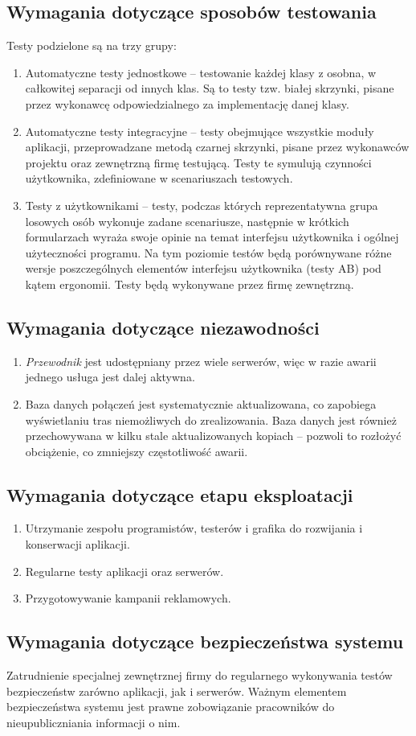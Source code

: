 \documentclass[12pt,a4paper]{report}
\begin{document}
\subsection{Wymagania dotyczące sposobów testowania}
Testy podzielone są na trzy grupy:
\begin{enumerate}
	\item Automatyczne testy jednostkowe -- testowanie każdej klasy z osobna, w całkowitej separacji od innych klas. Są to testy tzw. białej skrzynki, pisane przez wykonawcę odpowiedzialnego za implementację danej klasy.
	\item Automatyczne testy integracyjne -- testy obejmujące wszystkie moduły aplikacji, przeprowadzane metodą czarnej skrzynki, pisane przez wykonawców projektu oraz zewnętrzną firmę testującą. Testy te symulują czynności użytkownika, zdefiniowane w scenariuszach testowych.
	\item Testy z użytkownikami -- testy, podczas których reprezentatywna grupa losowych osób wykonuje zadane scenariusze, następnie w krótkich formularzach wyraża swoje opinie na temat interfejsu użytkownika i ogólnej użyteczności programu. Na tym poziomie testów będą porównywane różne wersje poszczególnych elementów interfejsu użytkownika (testy AB) pod kątem ergonomii. Testy będą wykonywane przez firmę zewnętrzną.
\end{enumerate}
\subsection{Wymagania dotyczące niezawodności}
\begin{enumerate}
	\item \emph{Przewodnik} jest udostępniany przez wiele serwerów, więc w razie awarii jednego usługa jest dalej aktywna.
	\item Baza danych połączeń jest systematycznie aktualizowana, co zapobiega wyświetlaniu tras niemożliwych do zrealizowania. Baza danych jest również przechowywana w kilku stale aktualizowanych kopiach -- pozwoli to rozłożyć obciążenie, co zmniejszy częstotliwość awarii.
\end{enumerate}
\subsection{Wymagania dotyczące etapu eksploatacji}
\begin{enumerate}
	\item Utrzymanie zespołu programistów, testerów i grafika do rozwijania i konserwacji aplikacji.
	\item Regularne testy aplikacji oraz serwerów.
	\item Przygotowywanie kampanii reklamowych.
\end{enumerate}	
\subsection{Wymagania dotyczące bezpieczeństwa systemu}
	Zatrudnienie specjalnej zewnętrznej firmy do regularnego wykonywania testów bezpieczeństw zarówno aplikacji, jak i serwerów. Ważnym elementem bezpieczeństwa systemu jest prawne zobowiązanie pracowników do nieupubliczniania informacji o nim.
\end{document}
